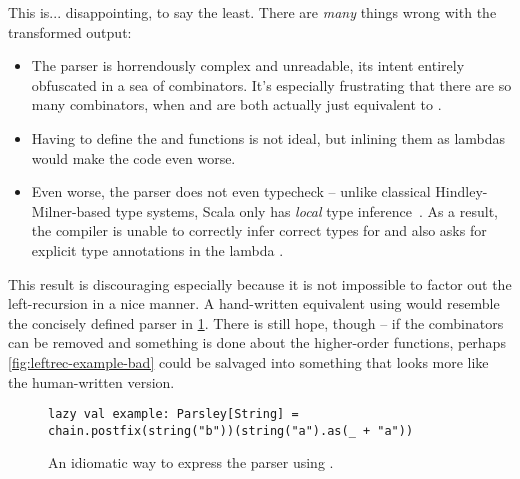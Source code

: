 \documentclass[../../main.tex]{subfiles}
\begin{document}
This is... disappointing, to say the least.
There are \emph{many} things wrong with the transformed output:
\begin{itemize}
  \item The parser is horrendously complex and unreadable, its intent entirely obfuscated in a sea of combinators. It's especially frustrating that there are so many  combinators, when  and  are both actually just equivalent to .
  \item Having to define the  and  functions is not ideal, but inlining them as lambdas would make the code even worse.
  \item Even worse, the parser does not even typecheck -- unlike classical Hindley-Milner-based type systems, Scala only has \emph{local} type inference~\cite{cremet_core_2006}. As a result, the compiler is unable to correctly infer correct types for  and also asks for explicit type annotations in the lambda .
\end{itemize}
This result is discouraging especially because it is not impossible to factor out the left-recursion in a nice manner.
A hand-written equivalent using  would resemble the concisely defined parser in \cref{fig:leftrec-example-hand}.
There is still hope, though -- if the  combinators can be removed and something is done about the higher-order functions, perhaps \cref{fig:leftrec-example-bad} could be salvaged into something that looks more like the human-written version.

\begin{figure}[htbp]
\begin{verbatim}
lazy val example: Parsley[String] = chain.postfix(string("b"))(string("a").as(_ + "a"))
\end{verbatim}
\caption{An idiomatic way to express the  parser using .}
\label{fig:leftrec-example-hand}
\end{figure}
\end{document}
